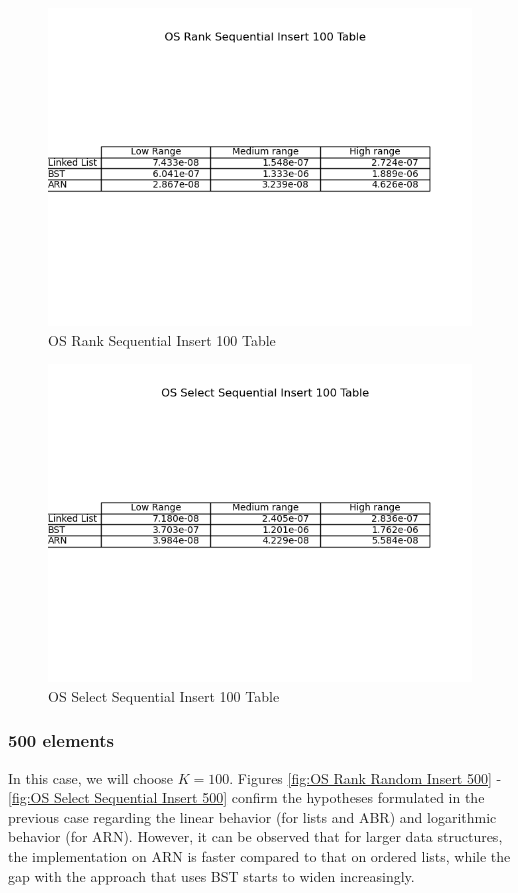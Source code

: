 \documentclass[11pt]{article}
\begin{document}
 \begin{figure}[H]
  \centering
  \includegraphics[width=0.8\linewidth]{Images/100/OS Rank Sequential Insert 100 Table.png}
  \caption{OS Rank Sequential Insert 100 Table }
  \label{fig:OS Rank Sequential Insert 100 Table}
\end{figure}
 \begin{figure}[H]
  \centering
  \includegraphics[width=0.8\linewidth]{Images/100/OS Select Sequential Insert 100 Table.png}
  \caption{OS Select Sequential Insert 100 Table }
  \label{fig:OS Select Sequential Insert 100 Table}
\end{figure}
\subsubsection{500 elements}

In this case, we will choose $K = 100$. 
Figures
\ref{fig:OS Rank Random Insert 500} - \ref{fig:OS Select Sequential Insert 500} confirm the hypotheses formulated in the previous case regarding the linear behavior (for lists and ABR) and logarithmic behavior (for ARN). However, it can be observed that for larger data structures, the implementation on ARN is faster compared to that on ordered lists, while the gap with the approach that uses BST starts to widen increasingly.
\end{document}
